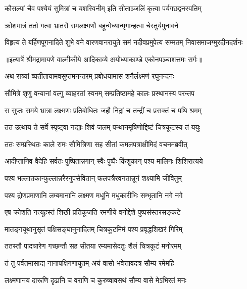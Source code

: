 \twolineshloka
{कौसल्यां चैव पश्येयं सुमित्रां च यशस्विनीम्}
{इति सीताञ्जलिं कृत्वा पर्यगछद्वनस्पतिम्} %

\twolineshloka
{क्रोशमात्रं ततो गत्वा भ्रातरौ रामलक्ष्मणौ}
{बहून्मेध्यान्मृगान्हत्वा चेरतुर्यमुनावने} %

\fourlineindentedshloka
{विहृत्य ते बर्हिणपूगनादिते}
{शुभे वने वारणवानरायुते}
{समं नदीवप्रमुपेत्य सम्मतम्}
{निवासमाजग्मुरदीनदर्शनः} %


{॥इत्यार्षे श्रीमद्रामायणे वाल्मीकीये आदिकाव्ये अयोध्याकाण्डे एकोनपञ्चाशत्तमः सर्गः॥}


\twolineshloka
{अथ रात्र्यां व्यतीतायामवसुप्तमनन्तरम्}
{प्रबोधयामास शनैर्लक्ष्मणं रघुनन्दनः} %

\twolineshloka
{सौमित्रे शृणु वन्यानां वल्गु व्याहरतां स्वनम्}
{सम्प्रतिष्ठामहे कालः प्रस्थानस्य परन्तप} %

\twolineshloka
{स सुप्तः समये भ्रात्रा लक्ष्मणः प्रतिबोधितः}
{जहौ निद्रां च तन्द्रीं च प्रसक्तं च पथि श्रमम्} %

\twolineshloka
{तत उत्थाय ते सर्वे स्पृष्ट्वा नद्याः शिवं जलम्}
{पन्थानमृषिणोद्दिष्टं चित्रकूटस्य तं ययुः} %

\twolineshloka
{ततः सम्प्रस्थितः काले रामः सौमित्रिणा सह}
{सीतां कमलपत्राक्षीमिदं वचनमब्रवीत्} %

\twolineshloka
{आदीप्तानिव वैदेहि सर्वतः पुष्पितान्नगान्}
{स्वैः पुष्पैः किंशुकान् पश्य मालिनः शिशिरात्यये} %

\twolineshloka
{पश्य भल्लातकान्फुल्लान्नरैरनुपसेवितान्}
{फलपत्रैरवनतान्नूनं शक्ष्यामि जीवितुम्} %

\twolineshloka
{पश्य द्रोणप्रमाणानि लम्बमानानि लक्ष्मण}
{मधूनि मधुकारीभिः सम्भृतानि नगे नगे} %

\twolineshloka
{एष क्रोशति नत्यूहस्तं शिखी प्रतिकूजति}
{रमणीये वनोद्देशे पुष्पसंस्तरसङ्कटे} %

\twolineshloka
{मातङ्गयूथानुसृतं पक्षिसङ्घानुनादितम्}
{चित्रकूटमिमं पश्य प्रवृद्धशिखरं गिरिम्} %

\twolineshloka
{ततस्तौ पादचारेण गच्छन्तौ सह सीतया}
{रम्यमासेदतुः शैलं चित्रकूटं मनोरमम्} %

\twolineshloka
{तं तु पर्वतमासाद्य नानापक्षिगणायुतम्}
{अयं वासो भवेत्तावदत्र सौम्य रमेमहि} %

\twolineshloka
{लक्ष्मणानय दारूणि दृढानि च वराणि च}
{कुरुष्वावसथं सौम्य वासे मेऽभिरतं मनः} %

